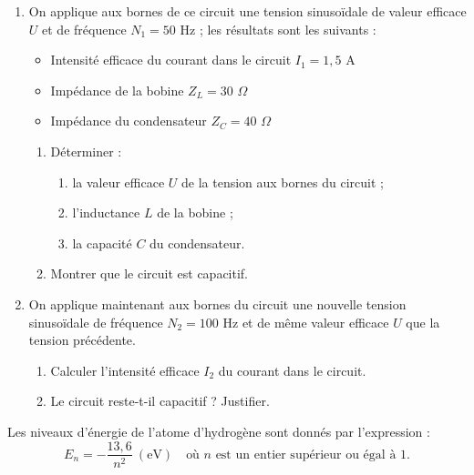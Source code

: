\documentclass[11pt]{article}
\begin{document}
\begin{enumerate}
  \item On applique aux bornes de ce circuit une tension sinusoïdale de valeur efficace $U$ et de fréquence $N_1 = 50$ Hz ; les résultats sont les suivants :
  \begin{itemize}
    \item Intensité efficace du courant dans le circuit $I_1 = 1{,}5$ A
    \item Impédance de la bobine $Z_L = 30$ $\Omega$
    \item Impédance du condensateur $Z_C = 40$ $\Omega$
  \end{itemize}
  \begin{enumerate}[label=\alph*.]
    \item Déterminer :
    \begin{enumerate}[label=a\textsubscript{\arabic*}.]
      \item la valeur efficace $U$ de la tension aux bornes du circuit ;
      \item l'inductance $L$ de la bobine ;
      \item la capacité $C$ du condensateur.
    \end{enumerate}
    \item Montrer que le circuit est capacitif.
  \end{enumerate}
  \item On applique maintenant aux bornes du circuit une nouvelle tension sinusoïdale de fréquence $N_2 = 100$ Hz et de même valeur efficace $U$ que la tension précédente.
  \begin{enumerate}[label=\alph*.]
    \item Calculer l'intensité efficace $I_2$ du courant dans le circuit.
    \item Le circuit reste-t-il capacitif ? Justifier.
  \end{enumerate}
\end{enumerate}


Les niveaux d'énergie de l'atome d'hydrogène sont donnés par l'expression :
\[ E_n = -\frac{13{,}6}{n^2}\ (\text{eV}) \quad \text{où } n \text{ est un entier supérieur ou égal à } 1. \]
\end{document}
